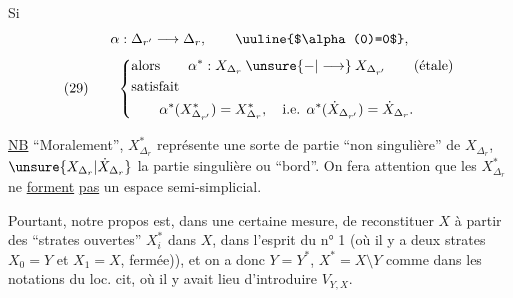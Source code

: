 Si
\[
\alpha:\Delta_{r'}\longrightarrow\Delta_r,\qquad \uuline{$\alpha(0)=0$},
\]
\[
(29)\qquad\left\{\begin{aligned}
&\text{alors}\qquad \alpha^*:X_{\Delta_r}\mathbin{\unsure{-|\longrightarrow}}X_{\Delta_{r'}}\qquad(\text{étale})\\
&\text{satisfait}\\
&\qquad\alpha^*(X_{\Delta_{r'}}^*)=X_{\Delta_r}^*,\quad\text{i.e. }\alpha^*(\dot X_{\Delta_{r'}})=\dot X_{\Delta_r}.
\end{aligned}\right.
\]


\uline{NB} ``Moralement'', $X_{\Delta_r}^*$ représente une sorte de partie ``non singulière'' de $X_{\Delta_r}$, $\unsure{X_{\Delta_r}|\dot X_{\Delta_r}}$ la partie singulière ou ``bord''. On fera attention que les $X_{\Delta_r}^*$ ne \uline{forment} \uline{pas} un espace semi-simplicial.

Pourtant, notre propos est, dans une certaine mesure, de reconstituer $X$ à partir des ``strates ouvertes'' $X_i^*$ dans $X$, dans l'esprit du n° 1 (où il y a deux strates $X_0=Y$ et $X_1=X$,   fermée)), et on a donc $Y=Y^*$, $X^*=X\setminus Y$ comme dans les notations du loc. cit, où il y avait lieu d'introduire $V_{Y,X}$.
